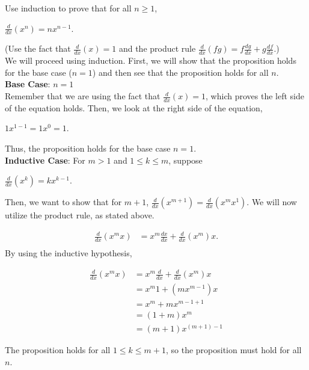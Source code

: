 \documentclass[12pt]{article}
\newenvironment{problem}[2][Problem]{\begin{trivlist}
\item[\hskip \labelsep {\bfseries #1}\hskip \labelsep {\bfseries #2.}]}{\end{trivlist}}
\begin{document}
\begin{problem}{6}
\noindent
Use induction to prove that for all $n \geq 1$,
\begin{center}
$\frac{d}{dx}(x^n)=nx^{n-1}$.
\end{center}

\noindent
(Use the fact that $\frac{d}{dx}(x)=1$ and the product rule $\frac{d}{dx}(fg)=f\frac{dg}{dx}+g\frac{df}{dx}$.) \\

\noindent
We will proceed using induction. First, we will show that the proposition holds for the base case ($n=1$) and then see that the proposition holds for all $n$. \\

\noindent
\textbf{Base Case}: $n=1$ \\

\noindent
Remember that we are using the fact that $\frac{d}{dx}(x)=1$, which proves the left side of the equation holds. Then, we look at the right side of the equation,

\begin{center}
$1x^{1-1}=1x^0=1$.
\end{center}

\noindent
Thus, the proposition holds for the base case $n=1$. \\

\noindent
\textbf{Inductive Case}: For $m>1$ and $1 \leq k \leq m$, suppose \\
\begin{center}
$\frac{d}{dx}(x^k)=kx^{k-1}$.
\end{center}

\noindent
Then, we want to show that for $m+1$, $\frac{d}{dx}(x^{m+1})=\frac{d}{dx}(x^mx^1)$. We will now utilize the product rule, as stated above. 

\begin{align*}
\frac{d}{dx}(x^mx) & =x^m\frac{dx}{dx} + \frac{d}{dx}(x^m)x. \\
\end{align*}
\noindent
By using the inductive hypothesis,

\begin{align*}
\frac{d}{dx}(x^mx) & =x^m\frac{d}{dx} + \frac{d}{dx}(x^m)x \\
& =x^m1 + (mx^{m-1})x \\
& =x^m + mx^{m-1+1} \\
& =(1+m)x^{m} \\
& =(m+1)x^{(m+1)-1}
\end{align*}

\noindent
The proposition holds for all $1 \leq k \leq m+1$, so the proposition must hold for all $n$. \qedsymbol
\end{problem}
\end{document}
